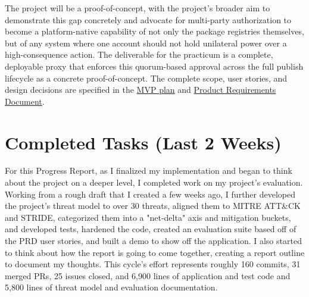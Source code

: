 \documentclass[12pt]{article}
\newcommand{\PRNumber}{4}
\newcommand{\RepoURL}{https://github.com/Ian-Costa18/Cybersecurity-Practicum/blob/progress-report-\PRNumber}
\begin{document}
The project will be a proof-of-concept, with the project's broader aim to demonstrate this gap concretely and advocate for multi-party authorization to become a platform-native capability of not only the package registries themselves, but of any system where one account should not hold unilateral power over a high-consequence action. The deliverable for the practicum is a complete, deployable proxy that enforces this quorum-based approval across the full publish lifecycle as a concrete proof-of-concept. The complete scope, user stories, and design decisions are specified in the \href{\RepoURL/docs/mvp.md}{MVP plan} and \href{\RepoURL/docs/mvp-prd.md}{Product Requirements Document}.

\section*{Completed Tasks (Last 2 Weeks)}

For this Progress Report, as I finalized my implementation and began to think about the project on a deeper level, I completed work on my project's evaluation. Working from a rough draft that I created a few weeks ago, I further developed the project's threat model to over 30 threats, aligned them to MITRE ATT\&CK and STRIDE, categorized them into a "net-delta" axis and mitigation buckets, and developed tests, hardened the code, created an evaluation suite based off of the PRD user stories, and built a demo to show off the application. I also started to think about how the report is going to come together, creating a report outline to document my thoughts. This cycle's effort represents roughly 160 commits, 31 merged PRs, 25 issues closed, and 6,900 lines of application and test code and 5,800 lines of threat model and evaluation documentation.
\end{document}
